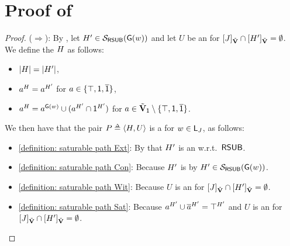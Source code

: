 \section{Proof of }\label{section: lemma: saturable path}
\begin{proof}
($\Rightarrow$):
By , let $\graph[2]' \in \FillS_{\RSUB}(\const{\graph}(\word))$ and let $U$ be an  for $\ljump{\graph[3]}_{\tilde{\vsig}} \cap \ljump{\graph[2]'}_{\tilde{\vsig}} = \emptyset$.
We define the  $\graph[2]$ as follows:
\begin{itemize}
       \item $\domain{\graph[2]} = \domain{\graph[2]'}$,
       \item $a^{\graph[2]} = a^{\graph[2]'}$ for $a \in \{\top, \mathsf{1}, \overline{\mathsf{1}}\}$,
       \item $a^{\graph[2]} = a^{\const{\graph}(\word)} \cup (a^{\graph[2]'} \cap \id^{\graph[2]'})$ for $a \in \tilde{\mathbf{V}}_{\mathsf{1}} \setminus \{\top, \mathsf{1}, \overline{\mathsf{1}}\}$.
\end{itemize}
We then have that the pair $P \defeq \tuple{\graph[2], U}$ is a  for $\word \in \const{L}_{\graph[3]}$, as follows:
\begin{itemize}
       \item \ref{definition: saturable path Ext}:
              By that $\graph[2]'$ is an  w.r.t.\ $\mathsf{RSUB}$.
       \item \ref{definition: saturable path Con}:
       Because $\graph[2]'$ is  by $\graph[2]' \in \FillS_{\RSUB}(\const{\graph}(\word))$.
\item \ref{definition: saturable path Wit}:
              Because $U$ is an  for $\ljump{\graph[3]}_{\tilde{\vsig}} \cap \ljump{\graph[2]'}_{\tilde{\vsig}} = \emptyset$.
       \item \ref{definition: saturable path Sat}:
              Because $a^{\graph[2]'} \cup \com{a}^{\graph[2]'} = \top^{\graph[2]'}$ and $U$ is an  for $\ljump{\graph[3]}_{\tilde{\vsig}} \cap \ljump{\graph[2]'}_{\tilde{\vsig}} = \emptyset$.
\end{itemize}


\end{proof}
